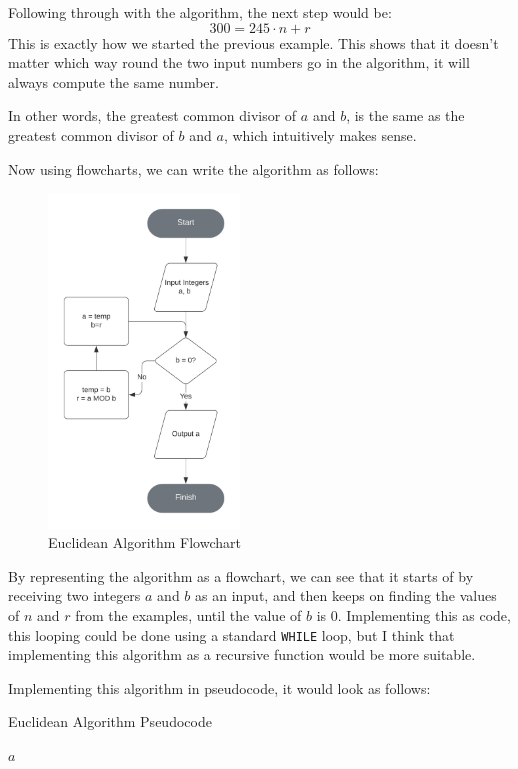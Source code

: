 \documentclass[12pt]{article}
\begin{document}
Following through with the algorithm, the next step would be:
$$300 = 245 \cdot n + r$$
This is exactly how we started the previous example. This shows that it doesn't matter which way round the two input numbers go in the algorithm, it will always compute the same number.

In other words, the greatest common divisor of $a$ and $b$, is the same as the greatest common divisor of $b$ and $a$, which intuitively makes sense.

Now using flowcharts, we can write the algorithm as follows:

\begin{figure}[h]
    \centering
    \caption{Euclidean Algorithm Flowchart}
    \captionsetup{justification=centering}
    \includegraphics[width=2in]{euclidean-algorithm-flowchart}
\end{figure}

By representing the algorithm as a flowchart, we can see that it starts of by receiving two integers $a$ and $b$ as an input, and then keeps on finding the values of $n$ and $r$ from the examples, until the value of $b$ is $0$. Implementing this as code, this looping could be done using a standard \texttt{WHILE} loop, but I think that implementing this algorithm as a recursive function would be more suitable.

Implementing this algorithm in pseudocode, it would look as follows:
\begin{algorithm}
    \caption{Euclidean Algorithm Pseudocode}
    \begin{algorithmic}
                \State \Return $a$
            \Else
                \State\Return{}
            \EndIf
        \EndFunction
    \end{algorithmic}
\end{algorithm}
\end{document}
